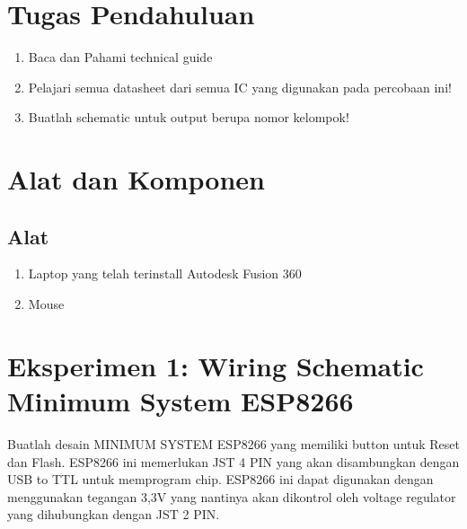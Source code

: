 \section{Tugas Pendahuluan}
\begin{enumerate}
    \item Baca dan Pahami technical guide
    \item Pelajari semua datasheet dari semua IC yang digunakan pada percobaan ini!
    \item Buatlah schematic untuk output berupa nomor kelompok!
\end{enumerate}

\section{Alat dan Komponen}
\subsection{Alat}
\begin{enumerate}
    \item Laptop yang telah terinstall Autodesk Fusion 360
    \item Mouse
\end{enumerate}

\section*{Eksperimen 1: Wiring Schematic Minimum System ESP8266}
Buatlah desain MINIMUM SYSTEM ESP8266 yang memiliki button untuk Reset dan
Flash. ESP8266 ini memerlukan JST 4 PIN yang akan disambungkan dengan USB to TTL untuk
memprogram chip. ESP8266 ini dapat digunakan dengan menggunakan tegangan 3,3V yang
nantinya akan dikontrol oleh voltage regulator yang dihubungkan dengan JST 2 PIN.

